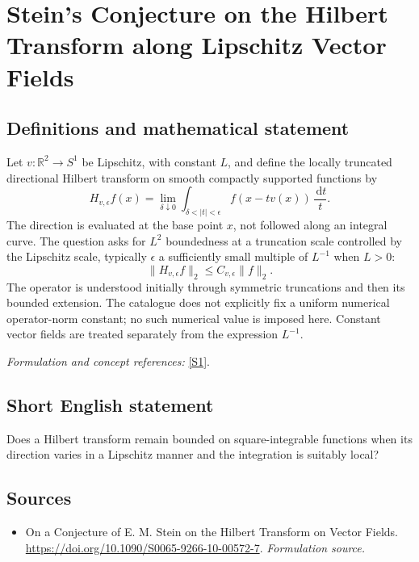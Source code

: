\documentclass[11pt]{article}
\begin{document}
\section*{\texorpdfstring{Stein's Conjecture on the Hilbert Transform along Lipschitz Vector Fields}{Stein's Conjecture on the Hilbert Transform along Lipschitz Vector Fields}}\label{434}
\subsection{Definitions and mathematical statement}
Let $v:{\mathbb{R}}^2\to S^1$ be Lipschitz, with constant $L$, and define the locally truncated directional Hilbert transform on smooth compactly supported functions by
\[
 H_{v,\epsilon}f(x)=\lim_{\delta\downarrow0}
 \int_{\delta<|t|<\epsilon}f(x-tv(x))\,\frac{{\,\mathrm{d}} t}{t}.
\]
The direction is evaluated at the base point $x$, not followed along an integral curve. The question asks for $L^2$ boundedness at a truncation scale controlled by the Lipschitz scale, typically $\epsilon$ a sufficiently small multiple of $L^{-1}$ when $L>0$:
\[
 \|H_{v,\epsilon}f\|_2\le C_{v,\epsilon}\|f\|_2.
\]
The operator is understood initially through symmetric truncations and then its bounded extension. The catalogue does not explicitly fix a uniform numerical operator-norm constant; no such numerical value is imposed here. Constant vector fields are treated separately from the expression $L^{-1}$.
\par\smallskip\textit{Formulation and concept references:} \href{https://doi.org/10.1090/S0065-9266-10-00572-7}{[S1]}.

\subsection{Short English statement}
Does a Hilbert transform remain bounded on square-integrable functions when its direction varies in a Lipschitz manner and the integration is suitably local?
\subsection{Sources}
\begin{itemize}
\item[S1]On a Conjecture of E. M. Stein on the Hilbert Transform on Vector Fields.
\url{https://doi.org/10.1090/S0065-9266-10-00572-7}.
\textit{Formulation source.}
\end{itemize}
\end{document}

